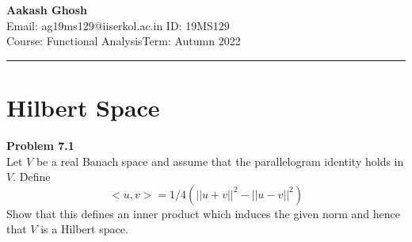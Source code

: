 \documentclass[a4paper, 11pt]{article}
\newenvironment{problem}[2][Problem]
    { \begin{mdframed}[backgroundcolor=gray!20] \textbf{#1 #2} \\}
    {  \end{mdframed}}
\begin{document}
\noindent








\large\textbf{Aakash Ghosh} \hfill \textbf{}   \\
Email: ag19ms129@iiserkol.ac.in  \hfill ID: 19MS129 \\
\normalsize Course: Functional Analysis\hfill Term: Autumn 2022\\
\noindent\rule{7in}{2.8pt}
\section{Hilbert Space}
\begin{problem}{7.1}
    Let $V$ be a real Banach space and assume that the parallelogram
    identity holds in $V$. Define
        $$<u,v>=1/4(||u+v||^2-||u-v||^2)$$
    Show that this defines an inner product which induces the given norm
    and hence that $V$ is a Hilbert space.
\end{problem}
\end{document}

